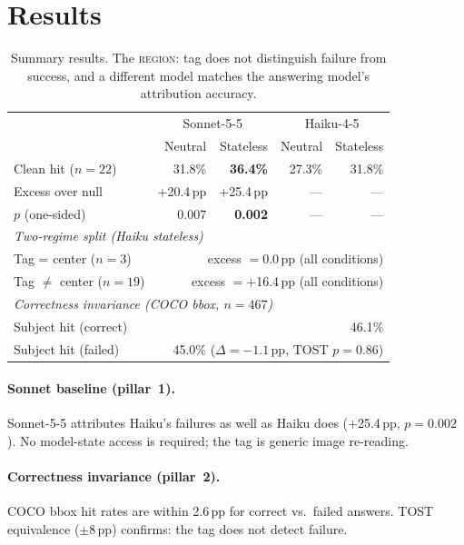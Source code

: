 \documentclass[11pt]{article}
\begin{document}
\section{Results}

\begin{table}[h]
\centering
\small
\begin{tabular}{lrrrr}
\toprule
 & \multicolumn{2}{c}{Sonnet-5-5} & \multicolumn{2}{c}{Haiku-4-5} \\
 & Neutral & Stateless & Neutral & Stateless \\
\midrule
Clean hit ($n{=}22$)   & 31.8\% & \textbf{36.4\%} & 27.3\% & 31.8\% \\
Excess over null       & $+$20.4\,pp & $+$25.4\,pp & — & — \\
$p$ (one-sided)        & 0.007 & \textbf{0.002} & — & — \\
\midrule
\multicolumn{5}{l}{\emph{Two-regime split (Haiku stateless)}} \\
Tag = center ($n{=}3$)       & \multicolumn{4}{r}{excess $= 0.0$\,pp (all conditions)} \\
Tag $\neq$ center ($n{=}19$) & \multicolumn{4}{r}{excess $= +$16.4\,pp (all conditions)} \\
\midrule
\multicolumn{5}{l}{\emph{Correctness invariance (COCO bbox, $n{=}467$)}} \\
Subject hit (correct)  & \multicolumn{4}{r}{46.1\%} \\
Subject hit (failed)   & \multicolumn{4}{r}{45.0\% ($\Delta{=}-1.1$\,pp, TOST $p{=}0.86$)} \\
\bottomrule
\end{tabular}
\caption{Summary results. The \textsc{region:} tag does not distinguish failure
from success, and a different model matches the answering model's attribution
accuracy.}
\end{table}

\paragraph{Sonnet baseline (pillar~1).}
Sonnet-5-5 attributes Haiku's failures as well as Haiku does ($+$25.4\,pp, $p{=}0.002$).
No model-state access is required; the tag is generic image re-reading.

\paragraph{Correctness invariance (pillar~2).}
COCO bbox hit rates are within 2.6\,pp for correct vs.\ failed answers.
TOST equivalence ($\pm$8\,pp) confirms: the tag does not detect failure.
\end{document}
